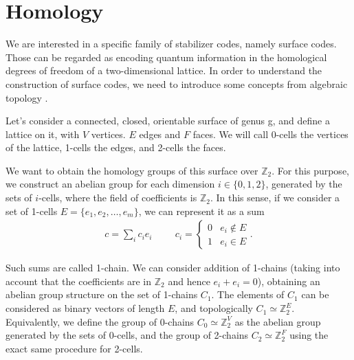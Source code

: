 \documentclass[12pt, twoside, openany]{book}
\begin{document}
\section{Homology}

We are interested in a specific family of stabilizer codes, namely surface codes. Those can be regarded as encoding quantum information in the homological degrees of freedom of a two-dimensional lattice. In order to understand the construction of surface codes, we need to introduce some concepts from algebraic topology \cite{bombin2013introductiontopologicalquantumcodes}. 

Let's consider a connected, closed, orientable surface of genus g, and define a lattice on it, with $V$ vertices. $E$ edges and $F$ faces. We will call 0-cells the vertices of the lattice, 1-cells the edges, and 2-cells the faces. 

We want to obtain the homology groups of this surface over $\mathbb{Z}_2$. For this purpose, we construct an abelian group for each dimension $i \in \{0, 1, 2\}$, generated by the sets of $i$-cells, where the field of coefficients is $\mathbb{Z}_2$. In this sense, if we consider a set of 1-cells $E = \{ e_1, e_2, \ldots, e_m \}$, we can represent it as a sum 
\begin{align}
    c = \sum_{i} c_i e_i \hspace{1cm} c_i = \begin{cases} 
0 & e_i \notin E \\ 
1 & e_i \in E 
\end{cases}.
\end{align}

Such sums are called 1-chain. We can consider addition of 1-chains (taking into account that the coefficients are in $\mathbb{Z}_2$ and hence $e_i + e_i = 0$), obtaining an abelian group structure on the set of 1-chains $C_1$. The elements of $C_1$ can be considered as binary vectors of length $E$, and topologically $C_1 \simeq \mathbb{Z}_2^E$. Equivalently, we define the group of 0-chains $C_0 \simeq \mathbb{Z}_2^V$ as the abelian group generated by the sets of 0-cells, and the group of 2-chains $C_2 \simeq \mathbb{Z}_2^F$ using the exact same procedure for 2-cells. 
\end{document}
